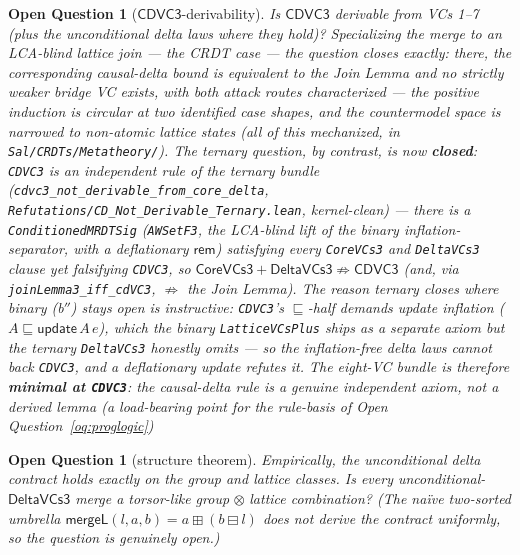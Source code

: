 \documentclass[11pt]{article}
\newtheorem{openq}[theorem]{Open Question}
\newcommand{\mergeL}{\mathsf{mergeL}}
\newcommand{\cd}{\mathsf{CDVC3}}
\newcommand{\lean}[1]{\texttt{#1}}
\begin{document}
\begin{openq}[$\cd$-derivability]
\label{oq:cd}
Is $\cd$ derivable from VCs 1--7 (plus the unconditional delta laws where
they hold)? Specializing the merge to an LCA-blind lattice join --- the
CRDT case --- the question closes exactly: there, the corresponding
causal-delta bound is \emph{equivalent} to the Join Lemma and no strictly
weaker bridge VC exists, with both attack routes
characterized --- the positive induction is circular at two identified case
shapes, and the countermodel space is narrowed to non-atomic lattice
states (all of this mechanized, in \lean{Sal/CRDTs/Metatheory/}). The
ternary question, by contrast, is now \textbf{closed}: \lean{CDVC3} is an
\emph{independent} rule of the ternary bundle
(\lean{cdvc3\_not\_derivable\_from\_core\_delta},
\lean{Refutations/CD\_Not\_Derivable\_Ternary.lean}, kernel-clean) --- there is
a \lean{ConditionedMRDTSig} (\lean{AWSetF3}, the LCA-blind lift of the binary
inflation-separator, with a deflationary $\mathsf{rem}$) satisfying every
\lean{CoreVCs3} and \lean{DeltaVCs3} clause yet falsifying \lean{CDVC3}, so
$\mathsf{CoreVCs3} + \mathsf{DeltaVCs3} \not\Rightarrow \mathsf{CDVC3}$ (and,
via \lean{joinLemma3\_iff\_cdVC3}, $\not\Rightarrow$ the Join Lemma). The
reason ternary \emph{closes} where binary (b$''$) stays open is instructive:
\lean{CDVC3}'s $\sqsubseteq$-half demands update \emph{inflation}
($A \sqsubseteq \mathsf{update}\,A\,e$), which the binary \lean{LatticeVCsPlus}
ships as a separate axiom but the ternary \lean{DeltaVCs3} honestly omits ---
so the inflation-free delta laws cannot back \lean{CDVC3}, and a deflationary
update refutes it. The eight-VC bundle is therefore \textbf{minimal at
\lean{CDVC3}}: the causal-delta rule is a genuine independent axiom, not a
derived lemma (a load-bearing point for the rule-basis of
Open Question~\ref{oq:proglogic})
\end{openq}

\begin{openq}[structure theorem]
Empirically, the \emph{unconditional} delta contract holds exactly on the
group and lattice classes. Is every unconditional-$\mathsf{DeltaVCs3}$
merge a torsor-like group$\,\otimes\,$lattice combination? (The na\"ive
two-sorted umbrella $\mergeL(l,a,b) = a \boxplus (b \boxminus l)$ does
\emph{not} derive the contract uniformly, so the question is genuinely
open.)
\end{openq}
\end{document}
